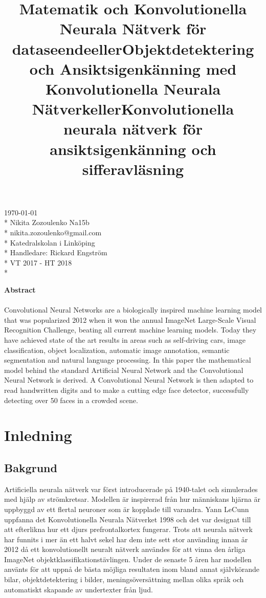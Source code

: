 \documentclass[a4paper,11pt,twoside]{article}
\title{Matematik och Konvolutionella Neurala Nätverk för dataseende}
\title{eller}
\title{Objektdetektering och Ansiktsigenkänning med Konvolutionella Neurala Nätverk}
\title{eller}
\title{Konvolutionella neurala nätverk för ansiktsigenkänning och sifferavläsning}
\date{}
\begin{document}
\maketitle
\vfill

\begin{flushright}
\today \\*
Nikita Zozoulenko Na15b \\*
nikita.zozoulenko@gmail.com \\*
Katedralskolan i Linköping\\*
Handledare: Rickard Engström \\*
VT 2017 - HT 2018 \\*
\end{flushright}
\newpage

\Large{\textbf{Abstract}}\\\\
Convolutional Neural Networks are a biologically inspired machine learning model that was popularized 2012 when it won the annual ImageNet Large-Scale Visual Recognition Challenge, beating all current machine learning models. Today they have achieved state of the art results in areas such as self-driving cars, image classification, object localization, automatic image annotation, semantic segmentation and natural language processing. In this paper the mathematical model behind the standard Artificial Neural Network and the Convolutional Neural Network is derived. A Convolutional Neural Network is then adapted to read handwritten digits and to make a cutting edge face detector, successfully detecting over 50 faces in a crowded scene.
\newpage

\tableofcontents

\section{Inledning}

\subsection{Bakgrund}
Artificiella neurala nätverk var först introducerade på 1940-talet och simulerades med hjälp av strömkretsar. Modellen är inspirerad från hur människans hjärna är uppbyggd av ett flertal neuroner som är kopplade till varandra. Yann LeCunn uppfanna det Konvolutionella Neurala Nätverket 1998 och det var designat till att efterlikna hur ett djurs prefrontalkortex fungerar. Trots att neurala nätverk har funnits i mer än ett halvt sekel har dem inte sett stor använding innan år 2012 då ett konvolutionellt neuralt nätverk användes för att vinna den årliga ImageNet objektklassifikationstävlingen. Under de senaste 5 åren har modellen använts för att uppnå de bästa möjliga resultaten inom bland annat självkörande bilar, objektdetektering i bilder, meningsöversättning mellan olika språk och automatiskt skapande av undertexter från ljud. \cite{cs231n}
\end{document}
